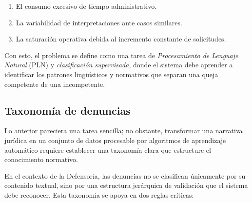 \begin{enumerate}
  \item El consumo excesivo de tiempo administrativo.
  \item La variabilidad de interpretaciones ante casos similares.
  \item La saturación operativa debida al incremento constante de solicitudes.
\end{enumerate}

Con esto, el problema se define como una tarea de \textit{Procesamiento de
Lenguaje Natural} (PLN) y \textit{clasificación supervisada}, donde el sistema
debe aprender a identificar los patrones lingüísticos y normativos que separan
una queja competente de una incompetente.

\subsection{Taxonomía de denuncias}

Lo anterior pareciera una tarea sencilla; no obstante, transformar una narrativa
jurídica en un conjunto de datos procesable por algoritmos de aprendizaje
automático requiere establecer una taxonomía clara que estructure el conocimiento
normativo.

En el contexto de la Defensoría, las denuncias no se clasifican únicamente por
su contenido textual, sino por una estructura jerárquica de validación que el
sistema debe reconocer. Esta taxonomía se apoya en dos reglas críticas:

